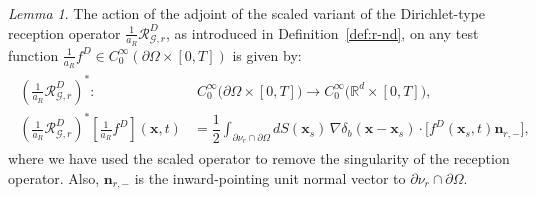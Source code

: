 \documentclass[11pt,reqno]{amsart}
\theoremstyle{remark}
\theoremstyle{italic_lemma}
\newtheorem{lemma}{Lemma}
\newcommand{\bx}{\boldsymbol{x}}
\newcommand{\bn}{\boldsymbol{n}}
\begin{document}
\begin{lemma}   \label{lemma:rt-d}
The action of the adjoint of the scaled variant of the Dirichlet-type reception operator \( \frac{1}{a_R} \mathcal{R}_{\mathcal{G},r}^D \), as introduced in Definition~\eqref{def:r-nd}, on any test function \(  \frac{1}{a_R} f^D \in  C_0^{\infty} \left(\partial \Omega \times [0, T] \right) \) is given by:
\begin{align}       \label{eq:meas-adj-d}
    \begin{split}
    \left(  \frac{1}{a_R} \mathcal{R}_{\mathcal{G},r}^D \right)^* \!:&\;  C_0^{\infty} \big(\partial \Omega \times [0, T] \big) \rightarrow C_0^{\infty} \big(\mathbb{R}^d \times [0,T] \big),\\
     \left(  \frac{1}{a_R} \mathcal{R}_{\mathcal{G},r}^D \right)^* [  \frac{1}{a_R} f^D ](\bx, t) &= 
     \dfrac{1}{2}   \displaystyle\int_{\partial \nu_r \cap \partial \Omega} d S(\bx_s)  \,   \nabla \delta_b(\bx - \bx_s) \cdot \big[f^D(\bx_s, t) \bn_{r,-} \big],
    \end{split}
\end{align}
where we have used the scaled operator to remove the singularity of the reception operator. Also, \( \bn_{r,-} \) is the inward-pointing unit normal vector to \( \partial \nu_r \cap \partial \Omega \).



\end{lemma}
\end{document}
